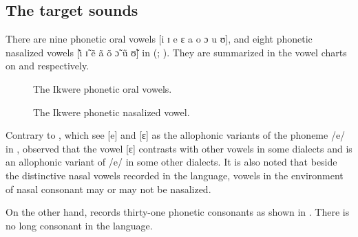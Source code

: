 \documentclass[output=paper,
modfonts
]{langscibook}
\begin{document}
\subsection{The target sounds}\label{sec:alerechi:1.4}

There are nine phonetic oral vowels [i ɪ e ɛ a o ɔ u ʊ], and eight phonetic nasalized vowels [{\~{\.\i}} \~ɪ ẽ ã õ \~ɔ \~u \~ʊ] in  (\citealt[42--43]{Donwa-IfodeEkwulo1987}; \citealt{Alerechi2007a}). They are summarized in the vowel charts on  and  respectively.

\begin{figure}
\parbox{.45\textwidth}{
\begin{vowel}
\end{vowel}
}

\caption{The Ikwere phonetic oral vowels.}
\label{fig:alerechi:1}
\end{figure}
 

\begin{figure}
\parbox{.45\textwidth}{
\begin{vowel}

\end{vowel}
}

\caption{The Ikwere phonetic nasalized vowel.}
\label{fig:alerechi:2}
\end{figure}

Contrary to \citet[42--43]{Donwa-IfodeEkwulo1987}, which see [e] and [ɛ] as the allophonic variants of the phoneme /e/ in , \citet[65]{Alerechi2007a} observed that the vowel [ɛ] contrasts with other vowels in some dialects and is an allophonic variant of /e/ in some other dialects. It is also noted that beside the distinctive nasal vowels recorded in the language, vowels in the environment of nasal consonant may or may not be nasalized. 

On the other hand,  records thirty-one phonetic consonants as shown in . There is no long consonant in the language. 
\end{document}

